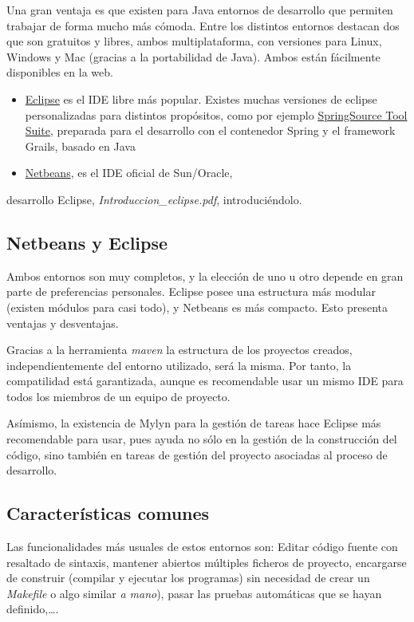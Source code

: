 \documentclass[11pt]{article}
\begin{document}
Una gran ventaja es que existen para Java entornos de desarrollo que permiten
trabajar de forma mucho más cómoda. Entre los distintos entornos destacan dos
que son gratuitos y libres, ambos multiplataforma, con versiones para Linux,
Windows y Mac (gracias a la portabilidad de Java). Ambos están fácilmente
disponibles en la web.

\begin{itemize} \item \href{http://eclipse.org/}{Eclipse} es el IDE libre más
popular. Existes muchas versiones de eclipse personalizadas para distintos
propósitos, como por ejemplo \href{http://www.springsource.org}{SpringSource
Tool Suite}, preparada para el desarrollo con el contenedor Spring y el
framework Grails, basado en Java \item \href{http://netbeans.org/}{Netbeans}, es
el IDE oficial de Sun/Oracle, \end{itemize}

desarrollo Eclipse, \emph{Introduccion\_{}eclipse.pdf}, introduciéndolo.

\subsection{Netbeans y Eclipse} \label{sec-3-1} Ambos entornos son muy
completos, y la elección de uno u otro depende en gran parte de preferencias
personales. Eclipse posee una estructura más modular (existen módulos para casi
todo), y Netbeans es más compacto. Esto presenta ventajas y desventajas.

Gracias a la herramienta \emph{maven} la estructura de los proyectos creados,
independientemente del entorno utilizado, será la misma. Por tanto, la
compatilidad está garantizada, aunque es recomendable usar un mismo IDE para
todos los miembros de un equipo de proyecto.

Asímismo, la existencia de Mylyn para la gestión de tareas hace Eclipse más
recomendable para usar, pues ayuda no sólo en la gestión de la construcción del
código, sino también en tareas de gestión del proyecto asociadas al proceso de
desarrollo.
 
\subsection{Características comunes} \label{sec-3-2} Las funcionalidades más
usuales de estos entornos son: Editar código fuente con resaltado de sintaxis,
mantener abiertos múltiples ficheros de proyecto, encargarse de construir
(compilar y ejecutar los programas) sin necesidad de crear un \emph{Makefile} o
algo similar \emph{a mano}), pasar las pruebas automáticas que se hayan
definido,\ldots{}.
\end{document}
